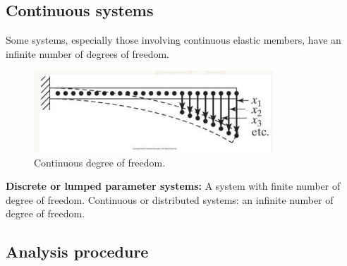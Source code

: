\documentclass[class=report, crop=false, 12pt,a4paper]{standalone}
\begin{document}
\subsection{Continuous systems}
Some systems, especially those involving continuous elastic members, have an infinite number of degrees of freedom.
\begin{figure}[H]
    \centering
    \includegraphics[width = 0.8\textwidth]{../img/diagram6.jpg}
    \caption{Continuous degree of freedom.}
\end{figure}
\textbf{Discrete or lumped parameter systems:} A system with finite number of degree of freedom.
Continuous or distributed systems: an infinite number of degree of freedom.
\subsection{Analysis procedure}
\end{document}
